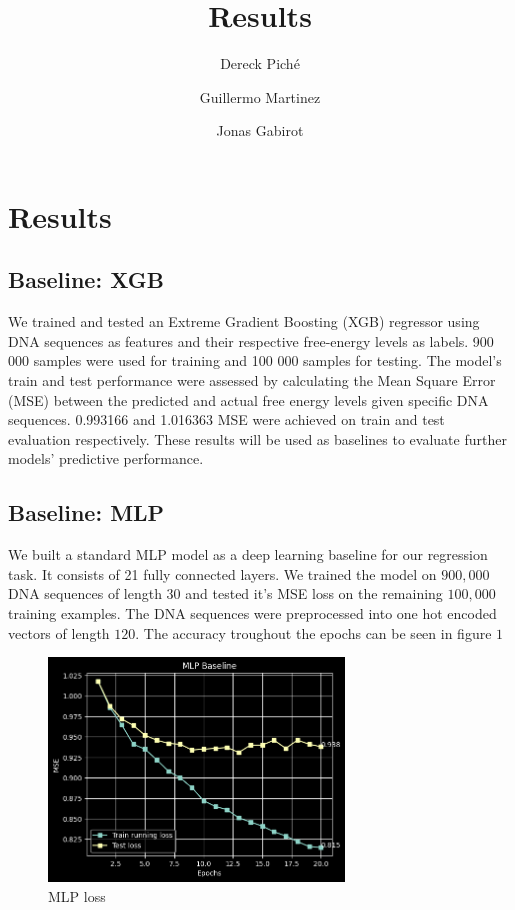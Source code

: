 \documentclass{article}
\title{Results}
\author
{
    Dereck Piché \and
    Guillermo Martinez \and
    Jonas Gabirot \and
}
\begin{document}
\maketitle

\section{Results}

\subsection{Baseline: XGB}
We trained and tested an Extreme Gradient Boosting (XGB) regressor using DNA sequences as features and their respective free-energy levels as labels. 900 000 samples were used for training and 100 000 samples for testing. The model's train and test performance were assessed by calculating the Mean Square Error (MSE) between the predicted and actual free energy levels given specific DNA sequences. 0.993166 and 1.016363 MSE were achieved on train and test evaluation respectively. These results will be used as baselines to evaluate further models' predictive performance.


\subsection{Baseline: MLP}
We built a standard MLP model as a deep learning baseline for our regression task. It consists of 21 fully connected layers. We trained the model on $900, 000$ DNA sequences of length $30$ and tested it's MSE loss on the remaining $100,000$ training examples. The DNA sequences were preprocessed into one hot encoded vectors of length $120$. The accuracy troughout the epochs can be seen in figure $1$ 
\begin{figure} \label{fig:mlp}
    \caption{MLP loss} \center
    \includegraphics[width=0.7\textwidth]{images/mlp.png}
\end{figure}
\end{document}
